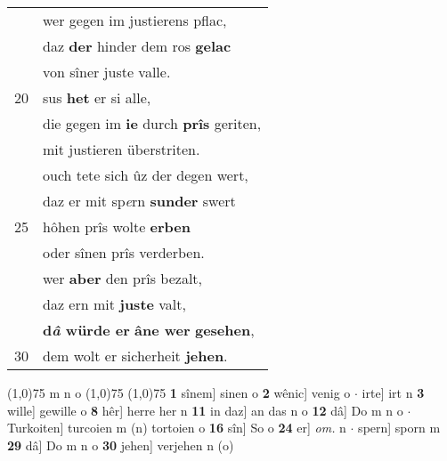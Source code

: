 \documentclass[8pt,a4paper,notitlepage]{article}
\begin{document}
\begin{table}[ht]
\begin{minipage}[t]{0.5\linewidth}
\begin{tabular}{rl}
 & wer gegen im justierens pflac,\\ 
 & daz \textbf{der} hinder dem ros \textbf{gelac}\\ 
 & von sîner juste valle.\\ 
20 & sus \textbf{het} er si alle,\\ 
 & die gegen im \textbf{ie} durch \textbf{prîs} geriten,\\ 
 & mit justieren überstriten.\\ 
 & ouch tete sich ûz der degen wert,\\ 
 & daz er mit sp\textit{e}rn \textbf{sunder} swert\\ 
25 & hôhen prîs wolte \textbf{erben}\\ 
 & oder sînen prîs verderben.\\ 
 & wer \textbf{aber} den prîs bezalt,\\ 
 & daz ern mit \textbf{juste} valt,\\ 
 & \textbf{d\textit{â} würde er} \textbf{âne wer} \textbf{gesehen},\\ 
30 & dem wolt er sicherheit \textbf{jehen}.\\ 
\end{tabular}
\scriptsize
\line(1,0){75} \newline
m n o \newline
\line(1,0){75} \newline
\newline
\line(1,0){75} \newline
\textbf{1} sînem] sinen o \textbf{2} wênic] venig o  $\cdot$ irte] irt n \textbf{3} wille] gewille o \textbf{8} hêr] herre her n \textbf{11} in daz] an das n o \textbf{12} dâ] Do m n o  $\cdot$ Turkoiten] turcoien m (n) tortoien o \textbf{16} sîn] So o \textbf{24} er] \textit{om.} n  $\cdot$ spern] sporn m \textbf{29} dâ] Do m n o \textbf{30} jehen] verjehen n (o) \newline
\end{minipage}
\end{table}
\newpage
\end{document}
